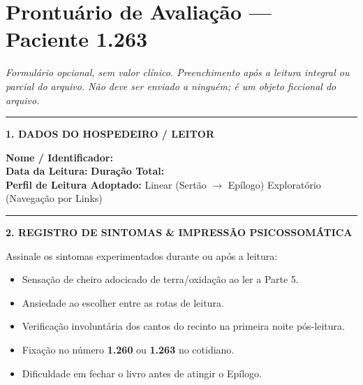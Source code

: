 \cleardoublepage
\thispagestyle{empty}
\chapter*{Prontuário de Avaliação --- Paciente 1.263}

\begingroup

\noindent\textit{Formulário opcional, sem valor clínico. Preenchimento após a leitura integral ou parcial do arquivo. Não deve ser enviado a ninguém; é um objeto ficcional do arquivo.}

\vspace{0.8em}
\noindent\rule{\textwidth}{0.8pt}
\vspace{0.5em}

\noindent\textbf{1. DADOS DO HOSPEDEIRO / LEITOR}

\vspace{0.4em}
\noindent\textbf{Nome / Identificador:} \dotfill\\[0.4em]
\noindent\textbf{Data da Leitura:} \dotfill \quad \textbf{Duração Total:} \dotfill\\[0.4em]
\noindent\textbf{Perfil de Leitura Adoptado:} \quad [ ~ ] Linear (Sertão $\to$ Epílogo) \quad [ ~ ] Exploratório (Navegação por Links)

\vspace{1em}
\noindent\rule{\textwidth}{0.5pt}
\vspace{0.5em}

\noindent\textbf{2. REGISTRO DE SINTOMAS \& IMPRESSÃO PSICOSSOMÁTICA}

\vspace{0.4em}
\noindent Assinale os sintomas experimentados durante ou após a leitura:

\vspace{0.3em}
\begin{itemize}[leftmargin=1.5em,itemsep=0.2em]
  \item[$\square$] Sensação de cheiro adocicado de terra/oxidação ao ler a Parte 5.
  \item[$\square$] Ansiedade ao escolher entre as rotas de leitura.
  \item[$\square$] Verificação involuntária dos cantos do recinto na primeira noite pós-leitura.
  \item[$\square$] Fixação no número \textbf{1.260} ou \textbf{1.263} no cotidiano.
  \item[$\square$] Dificuldade em fechar o livro antes de atingir o Epílogo.
\end{itemize}

